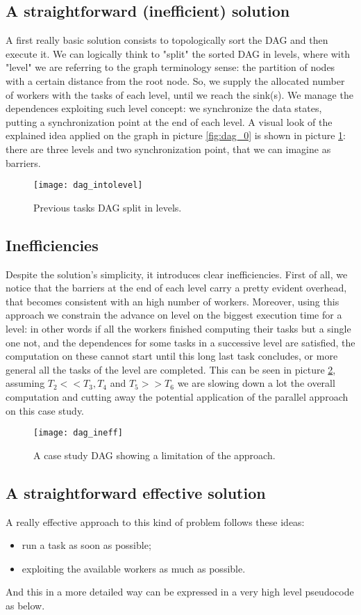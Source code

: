 \documentclass[a4paper,11pt]{article}
\begin{document}
\subsection{A straightforward (inefficient) solution}
A first really basic solution consists to topologically sort the DAG and then execute it.
We can logically think to "split" the sorted DAG in levels, where with "level" we are referring to the graph terminology sense: the partition of nodes with a certain distance from the root node.
So, we supply the allocated number of workers with the tasks of each level, until we reach the sink(s).
We manage the dependences exploiting such level concept: we synchronize the data states, putting a synchronization point at the end of each level.
A visual look of the explained idea applied on the graph in picture \ref{fig:dag_0} is shown in picture \ref{fig:dag_level}: there are three levels and two synchronization point, that we can imagine as barriers. 

 \begin{figure}[h]
	\centering
	\texttt{[image: dag\_intolevel]}
	\caption{Previous tasks DAG split in levels.}
	\label{fig:dag_level}
\end{figure}
\subsection{Inefficiencies}
Despite the solution's simplicity, it introduces clear inefficiencies.
First of all, we notice that the barriers at the end of each level carry a pretty evident overhead,  that becomes consistent with an high number of workers.
Moreover, using this approach we constrain the advance on level on the biggest execution time for a level: in other words if all the workers finished computing their tasks but a single one not,
and the dependences for some tasks in a successive level are satisfied, the computation on these cannot start until this long last task concludes, or more general all the tasks of the level are completed.
This can be seen in picture \ref{fig:dag_ineff}, assuming $T_2 << T_3, T_4$ and $T_5 >> T_6$ we are slowing down a lot the overall computation and cutting away the potential application of the parallel approach on this case study.
\begin{figure}[h]
	\centering
	\texttt{[image: dag\_ineff]}
	\caption{A case study DAG showing a limitation of the approach.}
	\label{fig:dag_ineff}
\end{figure}
\subsection{A straightforward effective solution}
A really effective approach to this kind of problem follows these ideas:
\begin{itemize}
   \item run a task as soon as possible;
   \item exploiting the available workers as much as possible.
 \end{itemize}
And this in a more detailed way can be expressed in a very high level pseudocode as below.\\
\end{document}
